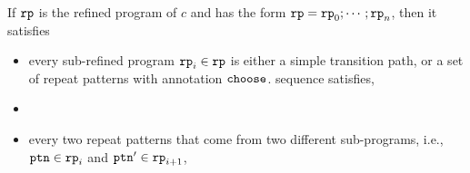 \begin{lem}
  If $\mathtt{rp}$  is the refined program of $c$ and has the form $ \mathtt{rp} = \mathtt{rp}_0; \cdots; \mathtt{rp}_n$,
  then it satisfies
  \begin{itemize}
    \item every sub-refined program $\mathtt{rp}_i \in \mathtt{rp}$ is either a simple transition path, or a set of repeat patterns with annotation $\mathtt{choose}$. sequence satisfies,
  \item 
  \item 
  every two repeat patterns that come from two different sub-programs, i.e.,
  $\mathtt{ptn} \in \mathtt{rp}_i$ and $\mathtt{ptn}' \in \mathtt{rp}_{i + 1}$,

\end{itemize}
\end{lem}
